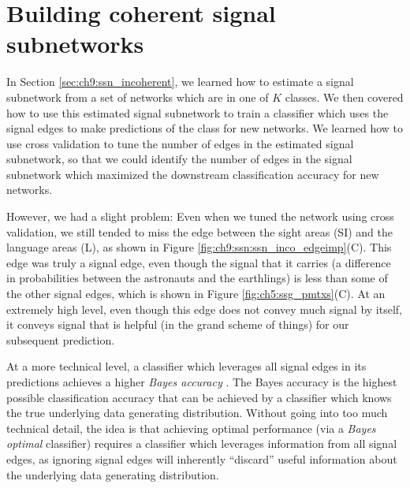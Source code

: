 \section{Building coherent signal subnetworks}
\label{sec:ch9:ssn_coherent}

In Section \ref{sec:ch9:ssn_incoherent}, we learned how to estimate a signal subnetwork from a set of networks which are in one of $K$ classes. We then covered how to use this estimated signal subnetwork to train a classifier which uses the signal edges to make predictions of the class for new networks. We learned how to use cross validation to tune the number of edges in the estimated signal subnetwork, so that we could identify the number of edges in the signal subnetwork which maximized the downstream classification accuracy for new networks. 

However, we had a slight problem: Even when we tuned the network using cross validation, we still tended to miss the edge between the sight areas (SI) and the language areas (L), as shown in Figure \ref{fig:ch9:ssn:ssn_inco_edgeimp}(C). This edge was truly a signal edge, even though the signal that it carries (a difference in probabilities between the astronauts and the earthlings) is less than some of the other signal edges, which is shown in Figure \ref{fig:ch5:ssg_pmtxs}(C). At an extremely high level, even though this edge does not convey much signal by itself, it conveys signal that is helpful (in the grand scheme of things) for our subsequent prediction. 

At a more technical level, a classifier which leverages all signal edges in its predictions achieves a higher \textit{Bayes accuracy} \cite{Vogelstein2013Jul,Fukunaga1990Oct}. The Bayes accuracy is the highest possible classification accuracy that can be achieved by a classifier which knows the true underlying data generating distribution. Without going into too much technical detail, the idea is that achieving optimal performance (via a \textit{Bayes optimal} classifier) requires a classifier which leverages information from all signal edges, as ignoring signal edges will inherently ``discard'' useful information about the underlying data generating distribution.

